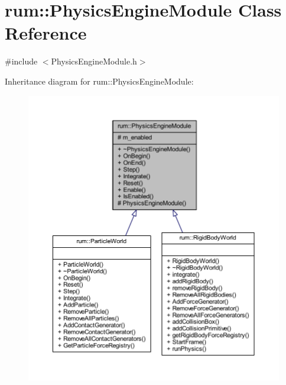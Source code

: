 \hypertarget{classrum_1_1_physics_engine_module}{}\section{rum\+:\+:Physics\+Engine\+Module Class Reference}
\label{classrum_1_1_physics_engine_module}


{\ttfamily \#include $<$Physics\+Engine\+Module.\+h$>$}



Inheritance diagram for rum\+:\+:Physics\+Engine\+Module\+:\nopagebreak
\begin{figure}[H]
\begin{center}
\leavevmode
\includegraphics[width=350pt]{classrum_1_1_physics_engine_module__inherit__graph}
\end{center}
\end{figure}



